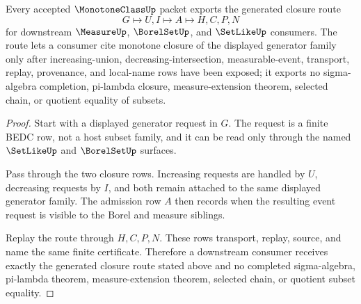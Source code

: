 \begin{theorem}
\label{thm:monotone-class-generated-closure-route}
Every accepted $\MonotoneClassUp$ packet exports the generated closure route
$$
G \longmapsto U,I \longmapsto A \longmapsto H,C,P,N
$$
for downstream $\MeasureUp$, $\BorelSetUp$, and $\SetLikeUp$ consumers. The route lets a consumer cite monotone closure of the displayed generator family only after increasing-union, decreasing-intersection, measurable-event, transport, replay, provenance, and local-name rows have been exposed; it exports no sigma-algebra completion, pi-lambda closure, measure-extension theorem, selected chain, or quotient equality of subsets.
\end{theorem}
\begin{proof}
Start with a displayed generator request in $G$. The request is a finite BEDC row, not a host subset family, and it can be read only through the named $\SetLikeUp$ and $\BorelSetUp$ surfaces.

Pass through the two closure rows. Increasing requests are handled by $U$, decreasing requests by $I$, and both remain attached to the same displayed generator family. The admission row $A$ then records when the resulting event request is visible to the Borel and measure siblings.

Replay the route through $H,C,P,N$. These rows transport, replay, source, and name the same finite certificate. Therefore a downstream consumer receives exactly the generated closure route stated above and no completed sigma-algebra, pi-lambda theorem, measure-extension theorem, selected chain, or quotient subset equality.
\end{proof}

